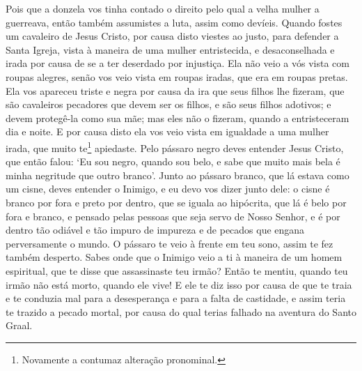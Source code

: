 Pois que a donzela vos tinha contado o direito pelo qual a velha mulher a
guerreava, então também assumistes a luta, assim como devíeis. Quando fostes um
cavaleiro de Jesus Cristo, por causa disto viestes ao justo, para defender a
Santa Igreja, vista à maneira de uma mulher entristecida, e desaconselhada e
irada por causa de se a ter deserdado por injustiça. Ela não veio a vós vista
com roupas alegres, senão vos veio vista em roupas iradas, que era em roupas
pretas. Ela vos apareceu triste e negra por causa da ira que seus filhos lhe
fizeram, que são cavaleiros pecadores que devem ser os filhos, e são seus
filhos adotivos; e devem protegê-la como sua mãe; mas eles não o fizeram,
quando a entristeceram dia e noite. E por causa disto ela vos veio
vista em igualdade a uma mulher irada, que muito te\footnote{ Novamente a
contumaz alteração pronominal. } apiedaste. Pelo pássaro negro deves
entender Jesus Cristo, que então falou: ‘Eu sou negro, quando sou belo, e sabe
que muito mais bela é minha negritude que outro branco’. Junto ao pássaro branco,
que lá estava como um cisne, deves entender o Inimigo, e eu devo vos dizer
junto dele: o cisne é branco por fora e preto por dentro, que se iguala ao
hipócrita, que lá é belo por fora e branco, e pensado pelas pessoas que seja
servo de Nosso Senhor, e é por dentro tão odiável e tão impuro  de impureza e
de pecados que engana perversamente o mundo. O pássaro te veio à frente em teu
sono, assim te fez também desperto. Sabes onde que o Inimigo veio a ti à
maneira de um homem espiritual, que te disse que assassinaste teu irmão? Então
te mentiu, quando teu irmão não está morto, quando ele vive! E ele te diz isso
por causa de que te traia e te conduzia mal para a desesperança e para a falta
de castidade, e assim teria te trazido a pecado mortal, por causa do qual
terias falhado na aventura do Santo Graal.  

